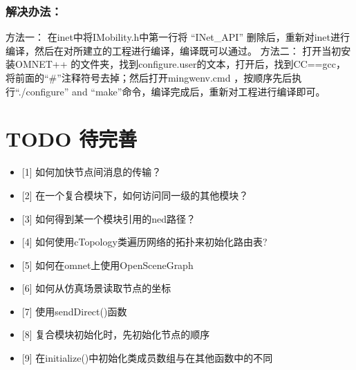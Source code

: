 \subsection{解决办法：}
\label{解决办法：}

方法一：
在inet中将IMobility.h中第一行将 ``INet\_API'' 删除后，重新对inet进行编译，然后在对所建立的工程进行编译，编译既可以通过。
方法二：
打开当初安装OMNET++ 的文件夹，找到configure.user的文本，打开后，找到CC==gcc，将前面的“\#”注释符号去掉；然后打开mingwenv.cmd
，按顺序先后执行``.\slash configure'' and ``make''命令，编译完成后，重新对工程进行编译即可。

\chapter{TODO 待完善}
\label{todo待完善}

\begin{itemize}
\item {[1]} 如何加快节点间消息的传输？

\item {[2]} 在一个复合模块下，如何访问同一级的其他模块？

\item {[3]} 如何得到某一个模块引用的ned路径？

\item {[4]} 如何使用cTopology类遍历网络的拓扑来初始化路由表?

\item {[5]} 如何在omnet上使用OpenSceneGraph

\item {[6]} 如何从仿真场景读取节点的坐标

\item {[7]} 使用sendDirect()函数

\item {[8]} 复合模块初始化时，先初始化节点的顺序

\item {[9]} 在initialize()中初始化类成员数组与在其他函数中的不同

\end{itemize}
